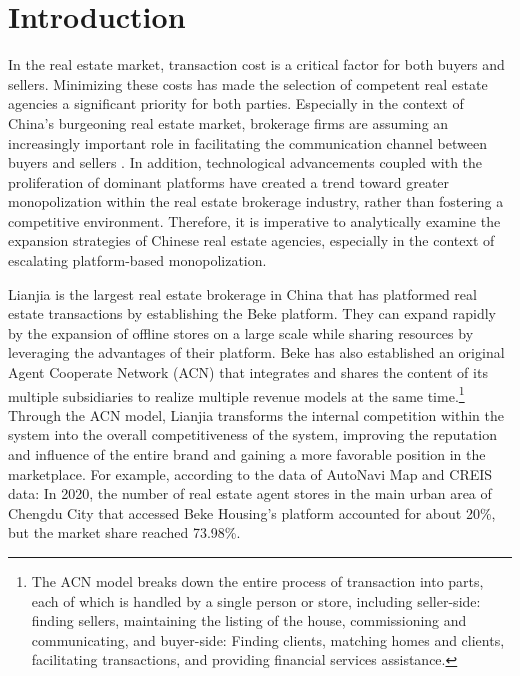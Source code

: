\documentclass[12pt]{article}
\begin{document}

\section{Introduction \label{sec:introduction}}

\noindent

In the real estate market, transaction cost is a critical factor for both buyers and sellers. Minimizing these costs has made the selection of competent real estate agencies a significant priority for both parties. Especially in the context of China's burgeoning real estate market, brokerage firms are assuming an increasingly important role in facilitating the communication channel between buyers and sellers \citep{glaeser_real_2017}. In addition, technological advancements coupled with the proliferation of dominant platforms have created a trend toward greater monopolization within the real estate brokerage industry, rather than fostering a competitive environment. Therefore, it is imperative to analytically examine the expansion strategies of Chinese real estate agencies, especially in the context of escalating platform-based monopolization.

Lianjia is the largest real estate brokerage in China that has platformed real estate transactions by establishing the Beke platform. They can expand rapidly by the expansion of offline stores on a large scale while sharing resources by leveraging the advantages of their platform. Beke has also established an original Agent Cooperate Network (ACN) that integrates and shares the content of its multiple subsidiaries to realize multiple revenue models at the same time.\footnote{The ACN model breaks down the entire process of transaction into parts, each of which is handled by a single person or store, including seller-side: finding sellers, maintaining the listing of the house, commissioning and communicating, and buyer-side: Finding clients, matching homes and clients, facilitating transactions, and providing financial services assistance.} Through the ACN model, Lianjia transforms the internal competition within the system into the overall competitiveness of the system, improving the reputation and influence of the entire brand and gaining a more favorable position in the marketplace. For example, according to the data of AutoNavi Map and CREIS data: In 2020, the number of real estate agent stores in the main urban area of Chengdu City that accessed Beke Housing's platform accounted for about 20\%, but the market share reached 73.98\%.
\end{document}
